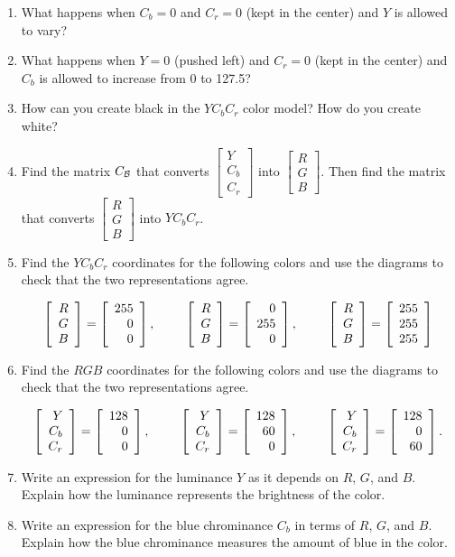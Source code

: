 \documentclass[12pt]{article}
\newcommand{\vs}[1]{\vspace{#1in}}
\newcommand{\threevec}[3]{\left[\begin{array}{r}#1 \\ #2 \\ #3
  \end{array}\right]}
\newcommand{\bcal}{{\cal B}}
\begin{document}
\begin{enumerate}
\begin{enumerate}[label=(\alph*)]
    \vs{0.5}
  \item What happens when $C_b=0$ and $C_r=0$ (kept in the center) and
    $Y$ is allowed to vary?

    \vs{0.5}
  \item What happens when $Y=0$ (pushed left) and $C_r=0$ (kept in the
    center) and $C_b$ is allowed to increase from 0 to 127.5?

    \vs{0.5}
  \item How can you create black in the $YC_bC_r$ color model?  How do
    you create white?

    \vs{0.5}
  \item Find the matrix $C_{\bcal}$ that converts $\threevec
    Y{C_b}{C_r}$ into $\threevec RGB$.  Then find the matrix that
    converts $\threevec RGB$ into $YC_bC_r$.

  \item Find the $YC_bC_r$ coordinates for the following colors and
    use the diagrams to check that the two representations agree.

    $$
    \threevec RGB = \threevec{255}00, \hspace*{24pt}
    \threevec RGB = \threevec0{255}0, \hspace*{24pt}
    \threevec RGB = \threevec{255}{255}{255}
    $$

    \vs{1}
  \item Find the $RGB$ coordinates for the following colors and
    use the diagrams to check that the two representations agree.

    $$
    \threevec Y{C_b}{C_r} = \threevec {128}00, \hspace*{24pt}
    \threevec Y{C_b}{C_r} = \threevec {128}{60}0, \hspace*{24pt}
    \threevec Y{C_b}{C_r} = \threevec {128}0{60}.
    $$

    \vs{1}
  \item Write an expression for the luminance $Y$ as it depends on
    $R$, $G$, and $B$.  Explain how the luminance represents the
    brightness of the color.

    \vs{1}
  \item Write an expression for the blue chrominance $C_b$ in terms of
    $R$, $G$, and $B$.  Explain how the blue chrominance measures the
    amount of blue in the color.
    



  \end{enumerate}

    
    

  
  
  
    
  

  
  
    

  
              
    
    


\end{enumerate}
\end{document}

